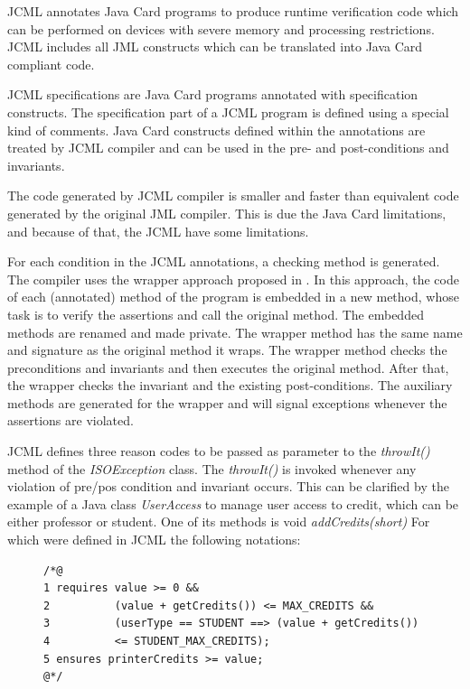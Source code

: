 \documentclass[10pt, conference, compsocconf]{IEEEtran}
\begin{document}
JCML \cite{CostaMMN09} \cite{CostaMMN12} annotates Java Card programs to produce
runtime verification code which can be performed on
devices with severe memory and processing restrictions.
JCML includes all JML \cite{jml} \cite{Leavens_2007} \cite{Bhorkar} constructs
which can be translated into Java Card compliant code.

JCML specifications are Java Card programs annotated
with specification constructs. The specification part of a
JCML program is defined using a special kind of
comments. Java Card constructs defined within the
annotations are treated by JCML compiler and can be
used in the pre- and post-conditions and invariants.

The code generated by JCML compiler is smaller and
faster than equivalent code generated by the original JML
compiler. This is due the Java Card limitations, and
because of that, the JCML have some limitations.

For each condition in the JCML annotations, a
checking method is generated. The compiler uses the
wrapper approach proposed in \cite{Cacho:2008}. In this approach, the
code of each (annotated) method of the program is
embedded in a new method, whose task is to verify the
assertions and call the original method. The embedded
methods are renamed and made private. The wrapper
method has the same name and signature as the original
method it wraps. The wrapper method checks the
preconditions and invariants and then executes the
original method. After that, the wrapper checks the
invariant and the existing post-conditions. The auxiliary
methods are generated for the wrapper and will signal
exceptions whenever the assertions are violated.

JCML defines three reason codes to be passed as
parameter to the \textit{throwIt()} method of the \textit{ISOException}
class. The \textit{throwIt()} is invoked whenever any violation
of pre/pos condition and invariant occurs. This can be
clarified by the example of a Java class \textit{UserAccess} to
manage user access to credit, which can be either
professor or student. One of its methods is void
\textit{addCredits(short)} For which were defined in JCML the
following notations:
 
\begin{figure}[ht!]
\centering  
\scriptsize 
\begin{verbatim}
/*@
1 requires value >= 0 && 
2          (value + getCredits()) <= MAX_CREDITS && 
3          (userType == STUDENT ==> (value + getCredits()) 
4          <= STUDENT_MAX_CREDITS);
5 ensures printerCredits >= value;
@*/
\end{verbatim}
\end{figure}
\end{document}
